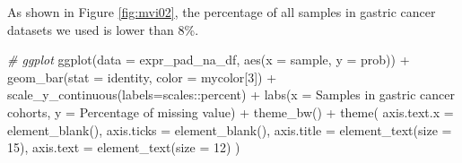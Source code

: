 \documentclass[
  12pt,
]{book}
\newenvironment{Shaded}{\begin{snugshade}}{\end{snugshade}}
\newcommand{\AttributeTok}[1]{\textcolor[rgb]{0.77,0.63,0.00}{#1}}
\newcommand{\CommentTok}[1]{\textcolor[rgb]{0.56,0.35,0.01}{\textit{#1}}}
\newcommand{\ControlFlowTok}[1]{\textcolor[rgb]{0.13,0.29,0.53}{\textbf{#1}}}
\newcommand{\DecValTok}[1]{\textcolor[rgb]{0.00,0.00,0.81}{#1}}
\newcommand{\FunctionTok}[1]{\textcolor[rgb]{0.00,0.00,0.00}{#1}}
\newcommand{\NormalTok}[1]{#1}
\newcommand{\OtherTok}[1]{\textcolor[rgb]{0.56,0.35,0.01}{#1}}
\newcommand{\SpecialCharTok}[1]{\textcolor[rgb]{0.00,0.00,0.00}{#1}}
\newcommand{\StringTok}[1]{\textcolor[rgb]{0.31,0.60,0.02}{#1}}
\begin{document}
\begin{Shaded}
\end{Shaded}

As shown in Figure \ref{fig:mvi02}, the percentage of all samples in gastric cancer datasets we used is lower than 8\%.

\begin{Shaded}
\begin{Highlighting}[]
\CommentTok{\# ggplot}
\FunctionTok{ggplot}\NormalTok{(}\AttributeTok{data =}\NormalTok{ expr\_pad\_na\_df, }
       \FunctionTok{aes}\NormalTok{(}\AttributeTok{x =}\NormalTok{ sample, }\AttributeTok{y =}\NormalTok{ prob)) }\SpecialCharTok{+} 
  \FunctionTok{geom\_bar}\NormalTok{(}\AttributeTok{stat =} \StringTok{\textquotesingle{}identity\textquotesingle{}}\NormalTok{, }\AttributeTok{color =}\NormalTok{ mycolor[}\DecValTok{3}\NormalTok{]) }\SpecialCharTok{+} 
  \FunctionTok{scale\_y\_continuous}\NormalTok{(}\AttributeTok{labels=}\NormalTok{scales}\SpecialCharTok{::}\NormalTok{percent) }\SpecialCharTok{+} 
  \FunctionTok{labs}\NormalTok{(}\AttributeTok{x =} \StringTok{\textquotesingle{}Samples in gastric cancer cohorts\textquotesingle{}}\NormalTok{, }
       \AttributeTok{y =} \StringTok{\textquotesingle{}Percentage of missing value\textquotesingle{}}\NormalTok{) }\SpecialCharTok{+} 
  \FunctionTok{theme\_bw}\NormalTok{() }\SpecialCharTok{+}
  \FunctionTok{theme}\NormalTok{(}
    \AttributeTok{axis.text.x =} \FunctionTok{element\_blank}\NormalTok{(),}
    \AttributeTok{axis.ticks =} \FunctionTok{element\_blank}\NormalTok{(),}
    \AttributeTok{axis.title =} \FunctionTok{element\_text}\NormalTok{(}\AttributeTok{size =} \DecValTok{15}\NormalTok{),}
    \AttributeTok{axis.text =} \FunctionTok{element\_text}\NormalTok{(}\AttributeTok{size =} \DecValTok{12}\NormalTok{)}
\NormalTok{  )}
\end{Highlighting}
\end{Shaded}
\end{document}
